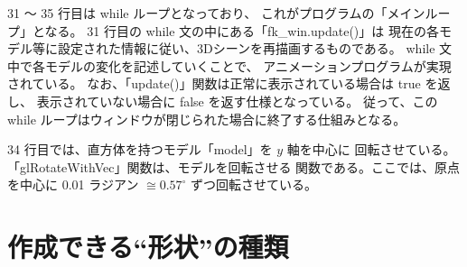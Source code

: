 31 〜 35 行目は while ループとなっており、
これがプログラムの「メインループ」となる。
31 行目の while 文の中にある「fk\_win.update()」は
現在の各モデル等に設定された情報に従い、3Dシーンを再描画するものである。
while 文中で各モデルの変化を記述していくことで、
アニメーションプログラムが実現されている。
なお、「update()」関数は正常に表示されている場合は true を返し、
表示されていない場合に false を返す仕様となっている。
従って、この while ループはウィンドウが閉じられた場合に終了する仕組みとなる。

34 行目では、直方体を持つモデル「model」を \(y\) 軸を中心に
回転させている。「glRotateWithVec」関数は、モデルを回転させる
関数である。ここでは、原点を中心に 0.01 ラジアン \(\cong 0.57^\circ\)
ずつ回転させている。

\section{作成できる``形状''の種類}

